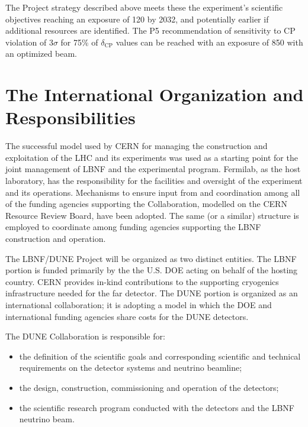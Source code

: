 \vspace{6pt}
The Project strategy described above meets these the experiment's scientific objectives
 reaching an exposure of 
\num{120}\ktMWyr{} by 2032, and potentially earlier if additional resources are identified. 
The P5 recommendation of sensitivity to CP violation of 3$\sigma$ for 75\% of $\delta_\text{CP}$
values can be reached with an exposure of \num{850}\ktMWyr{} with an optimized beam.

\section{The International Organization and Responsibilities}

The successful model used by CERN for managing the construction and exploitation of the LHC and its experiments was used as a starting point for the joint management of LBNF and the experimental program.  Fermilab, as the host laboratory, has the responsibility for the facilities and oversight of the experiment and its operations.  Mechanisms to ensure input from and coordination among all of the funding agencies supporting the Collaboration, modelled on the CERN Resource Review Board, have been adopted. The same (or a similar) structure is employed to coordinate among funding agencies supporting the LBNF construction and operation.  

The LBNF/DUNE Project will be organized as two distinct entities. The LBNF portion is funded primarily
by the the U.S. DOE acting on behalf of the hosting country.  CERN provides in-kind contributions to the supporting cryogenics infrastructure needed for the far detector. The DUNE portion is organized
as an international collaboration; it is adopting a model in which the DOE and international funding agencies share costs %
for the DUNE detectors.

The DUNE Collaboration is responsible for:
\begin{itemize}
\item the definition of the scientific goals and corresponding scientific and technical requirements on the detector systems and neutrino beamline;
\item the design, construction, commissioning and operation of the detectors;
\item the scientific research program conducted with the detectors and the LBNF neutrino beam.
\end{itemize}

